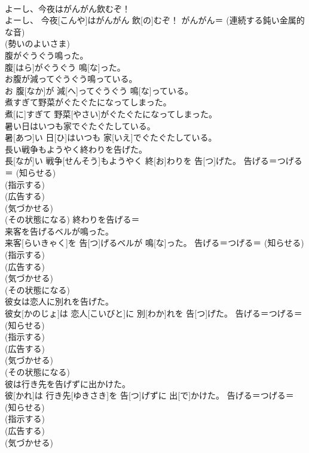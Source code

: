 \documentclass[8pt]{extreport}
\begin{document}
\begin{CJK}{UTF8}{min}
{\\	よーし、今夜はがんがん飲むぞ！	
\\	よーし、 今夜[こんや]はがんがん 飲[の]むぞ！	がんがん＝ (連続する鈍い金属的な音) 
\\	(勢いのよいさま)
\\	腹がぐうぐう鳴った。	
\\	腹[はら]がぐうぐう 鳴[な]った。	
\\	お腹が減ってぐうぐう鳴っている。	
\\	お 腹[なか]が 減[へ]ってぐうぐう 鳴[な]っている。	
\\	煮すぎて野菜がぐたぐたになってしまった。	
\\	煮[に]すぎて 野菜[やさい]がぐたぐたになってしまった。	
\\	暑い日はいつも家でぐたぐたしている。	
\\	暑[あつ]い 日[ひ]はいつも 家[いえ]でぐたぐたしている。	
\\	長い戦争もようやく終わりを告げた。	
\\	長[なが]い 戦争[せんそう]もようやく 終[お]わりを 告[つ]げた。	告げる＝つげる＝ (知らせる) 
\\	(指示する) 
\\	(広告する) 
\\	(気づかせる) 
\\	(その状態になる) 終わりを告げる＝ 
\\	来客を告げるベルが鳴った。	
\\	来客[らいきゃく]を 告[つ]げるベルが 鳴[な]った。	告げる＝つげる＝ (知らせる) 
\\	(指示する) 
\\	(広告する) 
\\	(気づかせる) 
\\	(その状態になる)
\\	彼女は恋人に別れを告げた。	
\\	彼女[かのじょ]は 恋人[こいびと]に 別[わか]れを 告[つ]げた。	告げる＝つげる＝ (知らせる) 
\\	(指示する) 
\\	(広告する) 
\\	(気づかせる) 
\\	(その状態になる)
\\	彼は行き先を告げずに出かけた。	
\\	彼[かれ]は 行き先[ゆきさき]を 告[つ]げずに 出[で]かけた。	告げる＝つげる＝ (知らせる) 
\\	(指示する) 
\\	(広告する) 
\\	(気づかせる) 
}
\end{CJK}
\end{document}

